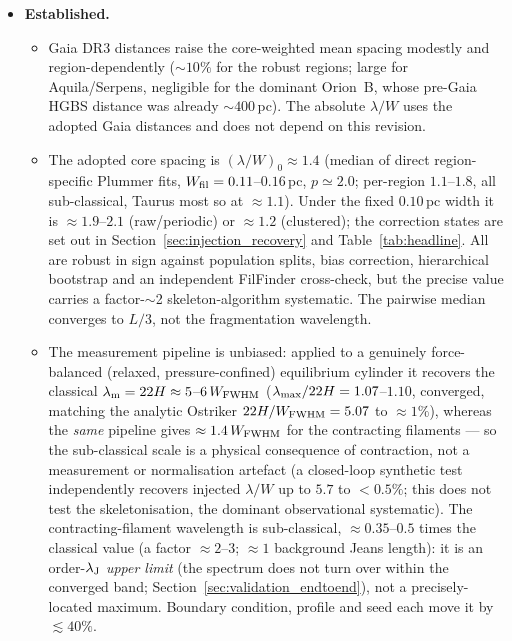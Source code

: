 \documentclass[usenatbib,twoside,twocolumn]{mnras}
\begin{document}
\begin{itemize}
    \item \textbf{Established.}
    \begin{itemize}
        \item Gaia DR3 distances raise the core-weighted mean spacing modestly and region-dependently ($\sim10\%$ for the robust regions; large for Aquila/Serpens, negligible for the dominant Orion~B, whose pre-Gaia HGBS distance was already $\sim400$\,pc). The absolute $\lambda/W$ uses the adopted Gaia distances and does not depend on this revision.
        \item The adopted core spacing is $(\lambda/W)_0\approx1.4$ (median of direct region-specific Plummer fits, $W_{\rm fil}=0.11$--$0.16$\,pc, $p\simeq2.0$; per-region $1.1$--$1.8$, all sub-classical, Taurus most so at $\approx1.1$). Under the fixed $0.10$\,pc width it is $\approx1.9$--$2.1$ (raw/periodic) or $\approx1.2$ (clustered); the correction states are set out in Section~\ref{sec:injection_recovery} and Table~\ref{tab:headline}. All are robust in sign against population splits, bias correction, hierarchical bootstrap and an independent FilFinder cross-check, but the precise value carries a factor-$\sim$2 skeleton-algorithm systematic. The pairwise median converges to $L/3$, not the fragmentation wavelength.
        \item The measurement pipeline is unbiased: applied to a genuinely force-balanced (relaxed, pressure-confined) equilibrium cylinder it recovers the classical $\lambda_{\rm m}=22H\approx5$--$6\,W_{\rm FWHM}$ ($\lambda_{\rm max}/22H=1.07$--$1.10$, converged, matching the analytic Ostriker $22H/W_{\rm FWHM}=5.07$ to $\approx1\%$), whereas the \emph{same} pipeline gives $\approx1.4\,W_{\rm FWHM}$ for the contracting filaments --- so the sub-classical scale is a physical consequence of contraction, not a measurement or normalisation artefact (a closed-loop synthetic test independently recovers injected $\lambda/W$ up to $5.7$ to $<0.5\%$; this does not test the skeletonisation, the dominant observational systematic). The contracting-filament wavelength is sub-classical, $\approx0.35$--$0.5$ times the classical value (a factor $\approx2$--$3$; $\approx1$ background Jeans length): it is an order-$\lambda_{\rm J}$ \emph{upper limit} (the spectrum does not turn over within the converged band; Section~\ref{sec:validation_endtoend}), not a precisely-located maximum. Boundary condition, profile and seed each move it by $\lesssim40\%$.

\end{itemize}
\end{itemize}
\end{document}
